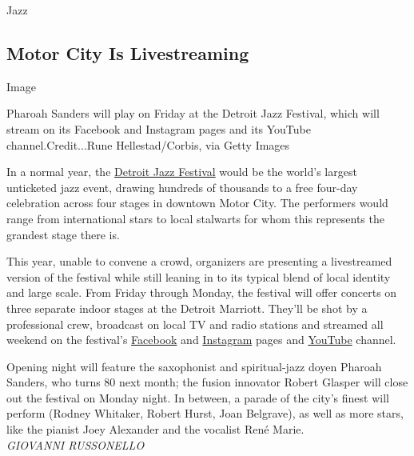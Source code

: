 Jazz

\hypertarget{motor-city-is-livestreaming}{%
\subsection{Motor City Is
Livestreaming}\label{motor-city-is-livestreaming}}

Image

Pharoah Sanders will play on Friday at the Detroit Jazz Festival, which
will stream on its Facebook and Instagram pages and its YouTube
channel.Credit...Rune Hellestad/Corbis, via Getty Images

In a normal year, the \href{https://www.detroitjazzfest.org/}{Detroit
Jazz Festival} would be the world's largest unticketed jazz event,
drawing hundreds of thousands to a free four-day celebration across four
stages in downtown Motor City. The performers would range from
international stars to local stalwarts for whom this represents the
grandest stage there is.

This year, unable to convene a crowd, organizers are presenting a
livestreamed version of the festival while still leaning in to its
typical blend of local identity and large scale. From Friday through
Monday, the festival will offer concerts on three separate indoor stages
at the Detroit Marriott. They'll be shot by a professional crew,
broadcast on local TV and radio stations and streamed all weekend on the
festival's
\href{http://r20.rs6.net/tn.jsp?f=001gQjjBgizUUhG4Wr15618rGOp-Dh3QL_WgahwePQ8VGFHtSrDirzSmIKWftLLO83Z1ExB5BuvxSjPmIm29W9wtOMZ8P7anOCaCT8IIjHP0I1jEumYgbSPJtYESaia6xx4zM-hIVHcfYiDCvI9TMP2xB52z-oPlBQxrRCl9dw4Ho0=\&c=FvY9qmiFaG2nWlp4d5pQwbgHTBLqoXI9XJcxFXwysV14x2xtAdtPFA==\&ch=UXQGp_16ETqtAMhdNIFDb-jwKAhFrG7ONOSyox0_jOncSiKxfDxLwQ==}{Facebook}
and
\href{http://r20.rs6.net/tn.jsp?f=001gQjjBgizUUhG4Wr15618rGOp-Dh3QL_WgahwePQ8VGFHtSrDirzSmMVv3xrV1RCHgyzc3vrKwYkH6H2rLDzWVUNETNr2XbHjRF_IYWT3H2vtmLUT9yYHfUrBWB63EDqdXaBfBFD4oGiX8h98a54cnfxLFhNl4mGp_3cq2mRtxZN3nuFm3t755w==\&c=FvY9qmiFaG2nWlp4d5pQwbgHTBLqoXI9XJcxFXwysV14x2xtAdtPFA==\&ch=UXQGp_16ETqtAMhdNIFDb-jwKAhFrG7ONOSyox0_jOncSiKxfDxLwQ==}{Instagram}
pages and
\href{https://www.youtube.com/channel/UCvB6Ds9N_nac9mlr_JW3s5w/featured}{YouTube}
channel.

Opening night will feature the saxophonist and spiritual-jazz doyen
Pharoah Sanders, who turns 80 next month; the fusion innovator Robert
Glasper will close out the festival on Monday night. In between, a
parade of the city's finest will perform (Rodney Whitaker, Robert Hurst,
Joan Belgrave), as well as more stars, like the pianist Joey Alexander
and the vocalist René Marie.\\
\emph{GIOVANNI RUSSONELLO}

